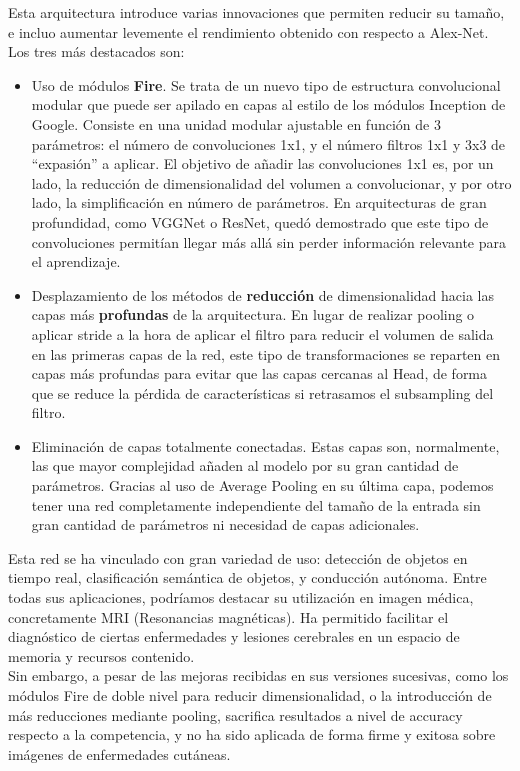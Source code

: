 Esta arquitectura introduce varias innovaciones que permiten reducir su tamaño, e incluo aumentar levemente el rendimiento obtenido con respecto a Alex-Net. Los tres más destacados son:
\begin{itemize}
    \item Uso de módulos \textbf{Fire}. Se trata de un nuevo tipo de estructura convolucional modular que puede ser apilado en capas al estilo de los módulos Inception de Google. Consiste en una unidad modular ajustable en función de 3 parámetros: el número de convoluciones 1x1, y el número filtros 1x1 y 3x3 de ``expasión'' a aplicar. El objetivo de añadir las convoluciones 1x1 es, por un lado, la reducción de dimensionalidad del volumen a convolucionar, y por otro lado, la simplificación en número de parámetros. En arquitecturas de gran profundidad, como VGGNet o ResNet, quedó demostrado que este tipo de convoluciones permitían llegar más allá sin perder información relevante para el aprendizaje.
    \item Desplazamiento de los métodos de \textbf{reducción} de dimensionalidad hacia las capas más \textbf{profundas} de la arquitectura. En lugar de realizar pooling o aplicar stride a la hora de aplicar el filtro para reducir el volumen de salida en las primeras capas de la red, este tipo de transformaciones se reparten en capas más profundas para evitar que las capas cercanas al Head, de forma que se reduce la pérdida de características si retrasamos el subsampling del filtro.
    \item Eliminación de capas totalmente conectadas. Estas capas son, normalmente, las que mayor complejidad añaden al modelo por su gran cantidad de parámetros. Gracias al uso de Average Pooling en su última capa, podemos tener una red completamente independiente del tamaño de la entrada sin gran cantidad de parámetros ni necesidad de capas adicionales.
\end{itemize}

Esta red se ha vinculado con gran variedad de uso: detección de objetos en tiempo real, clasificación semántica de objetos, y conducción autónoma. Entre todas sus aplicaciones, podríamos destacar su utilización en imagen médica, concretamente MRI (Resonancias magnéticas). Ha permitido facilitar el diagnóstico de ciertas enfermedades y lesiones cerebrales en un espacio de memoria y recursos contenido.\\

Sin embargo, a pesar de las mejoras recibidas en sus versiones sucesivas, como los módulos Fire de doble nivel para reducir dimensionalidad, o la introducción de más reducciones mediante pooling, sacrifica resultados a nivel de accuracy respecto a la competencia, y no ha sido aplicada de forma firme y exitosa sobre imágenes de enfermedades cutáneas.

